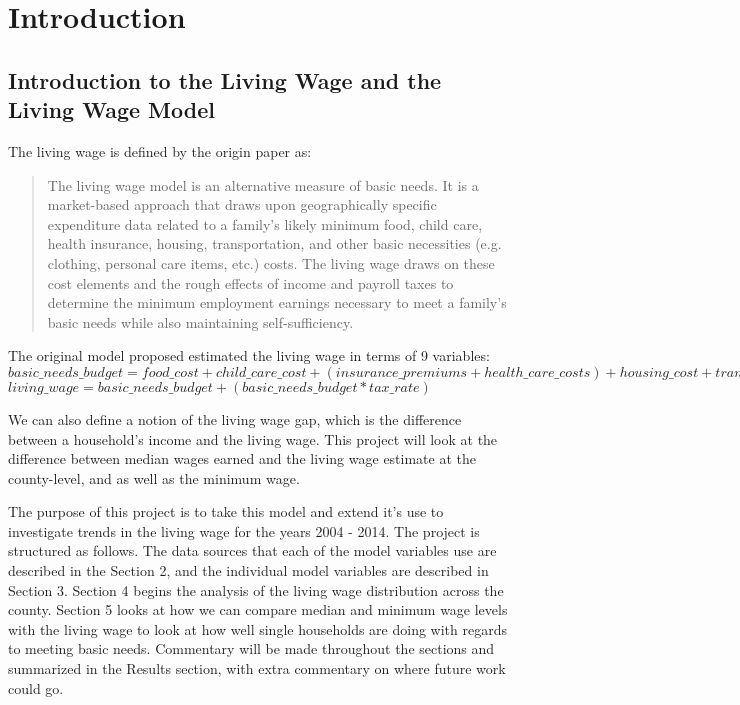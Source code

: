 \chapter{Introduction}\label{ch:introduction}

\section{Introduction to the Living Wage and the Living Wage Model}

The living wage is defined by the origin paper\cite{glasmeier2014} as:

\begin{quote}
The living wage model is an alternative measure of basic needs. It is a market-based approach that draws upon geographically specific expenditure data related to a family's likely minimum food, child care, health insurance, housing, transportation, and other basic necessities (e.g. clothing, personal care items, etc.) costs. The living wage draws on these cost elements and the rough effects of income and payroll taxes to determine the minimum employment earnings necessary to meet a family's basic needs while also maintaining self-sufficiency.
\end{quote}

The original model proposed estimated the living wage in terms of 9 variables:
\newline
\newline
$basic\_needs\_budget = food\_cost + child\_care\_cost + ( insurance\_premiums + health\_care\_costs ) + housing\_cost + transportation\_cost + other\_necessities\_cost$
\newline
\newline
$living\_wage = basic\_needs\_budget + ( basic\_needs\_budget * tax\_rate )$
\newline
\newline

We can also define a notion of the living wage gap, which is the difference between a household's income and the living wage. This project will look at the difference between median wages earned and the living wage estimate at the county-level, and as well as the minimum wage.

The purpose of this project is to take this model and extend it's use to investigate trends in the living wage for the years 2004 - 2014. The project is structured as follows. The data sources that each of the model variables use are described in the Section 2, and the individual model variables are described in Section 3. Section 4 begins the analysis of the living wage distribution across the county. Section 5 looks at how we can compare median and minimum wage levels with the living wage to look at how well single households are doing with regards to meeting basic needs. Commentary will be made throughout the sections and summarized in the Results section, with extra commentary on where future work could go.


